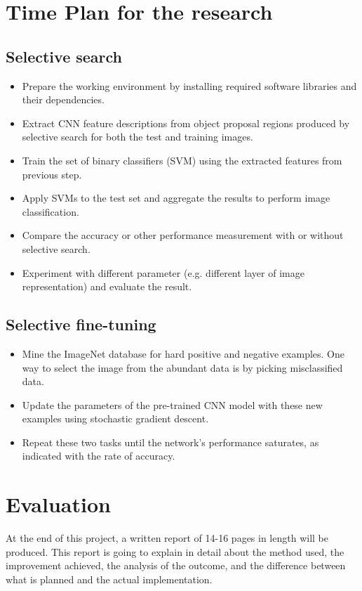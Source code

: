 \documentclass[a4paper]{article}
\begin{document}
\section{Time Plan for the research}

\subsection{Selective search}
\begin{itemize}
  \item Prepare the working environment by installing required software libraries
    and their dependencies.
  \item Extract CNN feature descriptions from object proposal regions produced by selective search 
    for both the test and training images.
  \item Train the set of binary classifiers (SVM) using the extracted features from previous step.
  \item Apply SVMs to the test set and aggregate the results to
    perform image classification.
  \item Compare the accuracy or other performance measurement with or without selective search.
  \item Experiment with different parameter (e.g. different layer of image representation) and evaluate the result.
\end{itemize}

\subsection{Selective fine-tuning}
\begin{itemize}
  \item Mine the ImageNet database for hard positive and negative examples. One way to select 
    the image from the abundant data is by picking misclassified data.
  \item Update the parameters of the pre-trained CNN model with these new examples using
    stochastic gradient descent.
  \item Repeat these two tasks until the network's performance saturates,
    as indicated with the rate of accuracy.
\end{itemize}


\section{Evaluation}
At the end of this project, a written report of 14-16 pages in length will be produced.
This report is going to explain in detail about the method used, the improvement achieved, 
the analysis of the outcome, and the difference between what is planned and the actual implementation.




\end{document}
